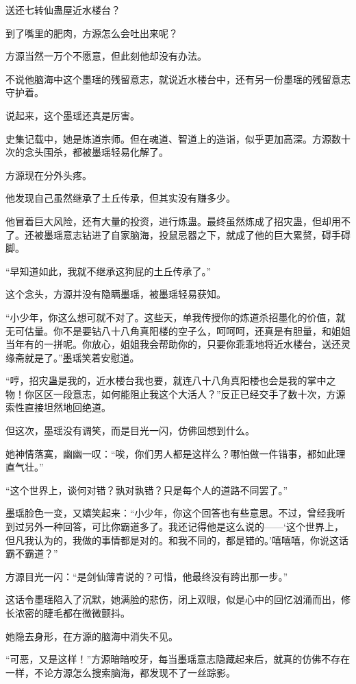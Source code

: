 \begin{this_body}
送还七转仙蛊屋近水楼台？

到了嘴里的肥肉，方源怎么会吐出来呢？

方源当然一万个不愿意，但此刻他却没有办法。

不说他脑海中这个墨瑶的残留意志，就说近水楼台中，还有另一份墨瑶的残留意志守护着。

说起来，这个墨瑶还真是厉害。

史集记载中，她是炼道宗师。但在魂道、智道上的造诣，似乎更加高深。方源数十次的念头围杀，都被墨瑶轻易化解了。

方源现在分外头疼。

他发现自己虽然继承了土丘传承，但其实没有赚多少。

他冒着巨大风险，还有大量的投资，进行炼蛊。最终虽然炼成了招灾蛊，但却用不了。还被墨瑶意志钻进了自家脑海，投鼠忌器之下，就成了他的巨大累赘，碍手碍脚。

“早知道如此，我就不继承这狗屁的土丘传承了。”

这个念头，方源并没有隐瞒墨瑶，被墨瑶轻易获知。

“小少年，你这么想可就不对了。这些天，单我传授你的炼道杀招墨化的价值，就无可估量。你不是要钻八十八角真阳楼的空子么，呵呵呵，还真是有胆量，和姐姐当年有的一拼呢。你放心，姐姐我会帮助你的，只要你乖乖地将近水楼台，送还灵缘斋就是了。”墨瑶笑着安慰道。

“哼，招灾蛊是我的，近水楼台我也要，就连八十八角真阳楼也会是我的掌中之物！你区区一段意志，如何能阻止我这个大活人？”反正已经交手了数十次，方源索性直接坦然地回绝道。

但这次，墨瑶没有调笑，而是目光一闪，仿佛回想到什么。

她神情落寞，幽幽一叹：“唉，你们男人都是这样么？哪怕做一件错事，都如此理直气壮。”

“这个世界上，谈何对错？孰对孰错？只是每个人的道路不同罢了。”

墨瑶脸色一变，又嬉笑起来：“小少年，你这个回答也有些意思。不过，曾经我听到过另外一种回答，可比你霸道多了。我还记得他是这么说的——‘这个世界上，但凡我认为的，我做的事情都是对的。和我不同的，都是错的。’嘻嘻嘻，你说这话霸不霸道？”

方源目光一闪：“是剑仙薄青说的？可惜，他最终没有跨出那一步。”

这话令墨瑶陷入了沉默，她满脸的悲伤，闭上双眼，似是心中的回忆汹涌而出，修长浓密的睫毛都在微微颤抖。

她隐去身形，在方源的脑海中消失不见。

“可恶，又是这样！”方源暗暗咬牙，每当墨瑶意志隐藏起来后，就真的仿佛不存在一样，不论方源怎么搜索脑海，都发现不了一丝踪影。


\end{this_body}
